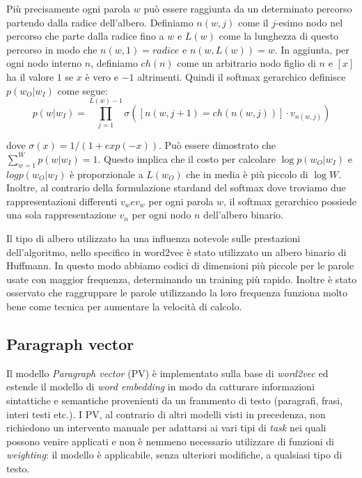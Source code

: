 \documentclass[a4paper,12pt,openright,twoside]{report}
\theoremstyle{definition}
\begin{document}
Più precisamente ogni parola $w$ può essere raggiunta da un determinato percorso partendo dalla radice
dell'albero. Definiamo $n(w,j)$ come il $j$-esimo nodo nel percorso che parte dalla radice fino a $w$ e $L(w)$ come
la lunghezza di questo percorso in modo che $n(w,1) = radice$ e $n(w,L(w)) = w$.
In aggiunta, per ogni nodo interno $n$, definiamo $ch(n)$ come un arbitrario nodo figlio di $n$ e $[x]$ ha il valore $1$ se $x$ è vero e $-1$ altrimenti.
Quindi il softmax gerarchico definisce $p(w_O|w_I)$ come segue:
\begin{equation}
	p(w|w_I) = \prod_{j=1}^{L(w)-1}\sigma([n(w,j+1)=ch(n(w,j))]\cdot v_{n(w,j)} )
	\label{eq:hierarchicalSoftmax}
\end{equation}

dove $\sigma(x) = 1/(1+exp(-x))$. Può essere dimostrato che $\sum_{w=1}^W p(w|w_I) = 1$. Questo implica
che il costo per calcolare $\log p(w_O|w_I)$ e $log p(w_O|w_I)$ è proporzionale a $L(w_O)$ che in media
è più piccolo di $\log W$.
Inoltre, al contrario della formulazione stardand del softmax dove troviamo due rappresentazioni differenti 
$v_w e v_w$ per ogni parola $w$, il softmax gerarchico possiede una sola rappresentazione $v_n$ per ogni nodo $n$
dell'albero binario.

Il tipo di albero utilizzato ha una influenza notevole sulle prestazioni dell'algoritmo, nello specifico
in word2vec è stato utilizzato un albero binario di Huffmann. In questo modo 
abbiamo codici di dimensioni più piccole per le parole usate con maggior frequenza,
determinando un training più rapido.
Inoltre è stato osservato che raggruppare le parole utilizzando la loro frequenza funziona molto
bene come tecnica per aumentare la velocità di calcolo.

\subsection{Paragraph vector}
\label{sss:pv}
Il modello \emph{Paragraph vector} (PV) è implementato sulla base di \emph{word2vec} ed
estende il modello di \emph{word embedding} in modo da catturare informazioni sintattiche e semantiche 
provenienti da un frammento di testo (paragrafi, frasi, interi testi etc.).
I PV, al contrario di altri modelli visti in precedenza, non richiedono un intervento
manuale per adattarsi ai vari tipi di \emph{task} nei quali possono venire applicati
e non è nemmeno necessario utilizzare di funzioni di \emph{weighting}: il modello
è applicabile, senza ulteriori modifiche, a qualsiasi tipo di testo.
\end{document}

